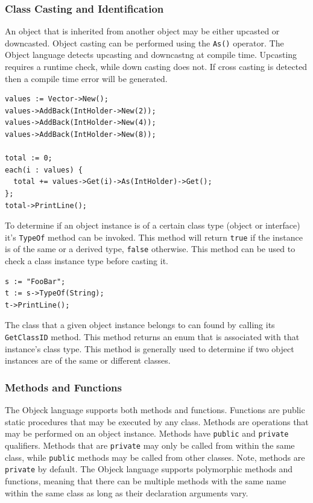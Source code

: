 \documentclass[11pt]{article}
\begin{document}
\subsubsection{Class Casting and Identification}
An object that is inherited from another object may be either upcasted
or downcasted.  Object casting can be performed using the
\texttt{As()} operator.  The Object language detects upcasting and
downcastng at compile time. Upcasting requires a runtime check, while
down casting does not. If cross casting is detected then a compile
time error will be generated.

\begin{verbatim}
values := Vector->New();
values->AddBack(IntHolder->New(2));
values->AddBack(IntHolder->New(4));
values->AddBack(IntHolder->New(8));

total := 0;
each(i : values) {
  total += values->Get(i)->As(IntHolder)->Get();
};
total->PrintLine();
\end{verbatim}

To determine if an object instance is of a certain class type (object
or interface) it's \texttt{TypeOf} method can be invoked.  This method will return
\texttt{true} if the instance is of the same or a derived type,
\texttt{false} otherwise.  This method can be used to check a class
instance type before casting it.

\begin{verbatim}
s := "FooBar";
t := s->TypeOf(String);
t->PrintLine();
\end{verbatim}

The class that a given object instance belongs to can found by calling
its \texttt{GetClassID} method.  This method returns an enum that is
associated with that instance's class type.  This method is generally
used to determine if two object instances are of the same or different
classes.

\subsubsection{Methods and Functions}
The Objeck language supports both methods and functions.  Functions are
public static procedures that may be executed by any class.  Methods
are operations that may be performed on an object instance.  Methods
have \texttt{public} and \texttt{private} qualifiers.  Methods that
are \texttt{private} may only be called from within the same class,
while \texttt{public} methods may be called from other classes.  Note,
methods are \texttt{private} by default. The Objeck language supports
polymorphic methods and functions, meaning that there can be multiple
methods with the same name within the same class as long as their
declaration arguments vary.
\end{document}
